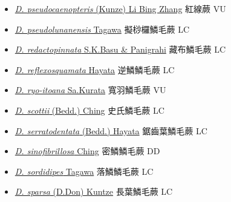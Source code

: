 \begin{itemize}
\begin{itemize}
        \item[] \href{http://www.theplantlist.org/tpl1.1/search?q=Dryopteris+pseudocaenopteris}{\textit{D. pseudocaenopteris} (Kunze) Li Bing Zhang}   紅線蕨   VU
        \item[] \href{http://www.theplantlist.org/tpl1.1/search?q=Dryopteris+pseudolunanensis}{\textit{D. pseudolunanensis} Tagawa}   擬桫欏鱗毛蕨   LC
        \item[] \href{http://www.theplantlist.org/tpl1.1/search?q=Dryopteris+redactopinnata}{\textit{D. redactopinnata} S.K.Basu \& Panigrahi}   藏布鱗毛蕨   LC
        \item[] \href{http://www.theplantlist.org/tpl1.1/search?q=Dryopteris+reflexosquamata}{\textit{D. reflexosquamata} Hayata}   逆鱗鱗毛蕨   LC
        \item[] \href{http://www.theplantlist.org/tpl1.1/search?q=Dryopteris+ryo-itoana}{\textit{D. ryo-itoana} Sa.Kurata}   寬羽鱗毛蕨   VU
        \item[] \href{http://www.theplantlist.org/tpl1.1/search?q=Dryopteris+scottii}{\textit{D. scottii} (Bedd.) Ching}   史氏鱗毛蕨   LC
        \item[] \href{http://www.theplantlist.org/tpl1.1/search?q=Dryopteris+serratodentata}{\textit{D. serratodentata} (Bedd.) Hayata}   鋸齒葉鱗毛蕨   LC
        \item[] \href{http://www.theplantlist.org/tpl1.1/search?q=Dryopteris+sinofibrillosa}{\textit{D. sinofibrillosa} Ching}   密鱗鱗毛蕨   DD
        \item[] \href{http://www.theplantlist.org/tpl1.1/search?q=Dryopteris+sordidipes}{\textit{D. sordidipes} Tagawa}   落鱗鱗毛蕨   LC
        \item[] \href{http://www.theplantlist.org/tpl1.1/search?q=Dryopteris+sparsa}{\textit{D. sparsa} (D.Don) Kuntze}   長葉鱗毛蕨   LC

\end{itemize}
\end{itemize}
